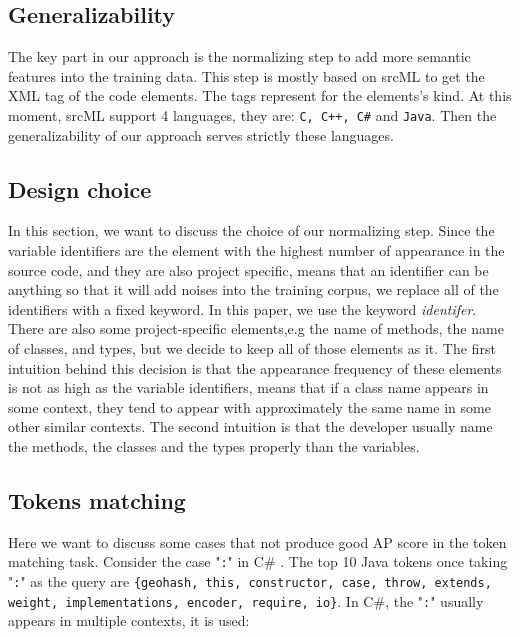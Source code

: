 \subsection{Generalizability}

The key part in our approach is the normalizing step to add more semantic features into the training data. This step is mostly based on srcML \cite{collard2011lightweight} to get the XML tag of the code elements. The tags represent for the elements's kind. At this moment, srcML support 4 languages, they are: \texttt{C, C++, C\#} and \texttt{Java}. Then the generalizability of our approach serves strictly these languages.

\subsection{Design choice}
In this section, we want to discuss the choice of our normalizing step.
Since the variable identifiers are the element with the highest number of appearance in the source code, and they are also project specific, means that an identifier can be anything so that it will add noises into the training corpus, we replace all of the identifiers with a fixed keyword. In this paper, we use the keyword \textit{identifer}. There are also some project-specific elements,e.g the name of methods, the name of classes, and types, but we decide to keep all of those elements as it. The first intuition behind this decision is that the appearance frequency of these elements is not as high as the variable identifiers, means that if a class name appears in some context, they tend to appear with approximately the same name in some other similar contexts. The second intuition is that the developer usually name the methods, the classes and the types properly than the variables.

\subsection{Tokens matching}
Here we want to discuss some cases that not produce good AP score in the token matching task. Consider the case "\texttt{:}" in C\# . The top 10 Java tokens once taking "\texttt{:}" as the query are \texttt{\{geohash, this, constructor, case, throw, extends, weight, implementations, encoder, require, io\}}. In C\#, the "\texttt{:}" usually appears in multiple contexts, it is used:

